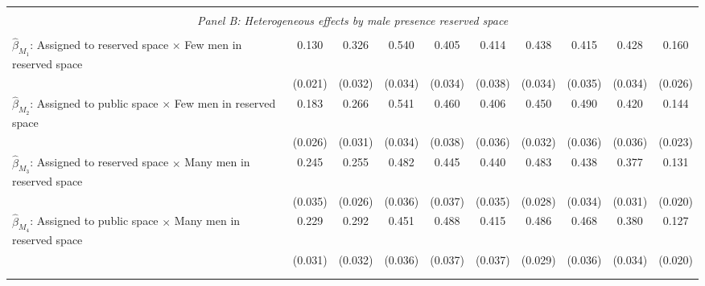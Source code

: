 \begin{tabular}{l*{9}{c}}
\hline \\[-1ex] \multicolumn{10}{c}{\textit{Panel B: Heterogeneous effects by male presence reserved space}} \\\\[-1ex]
$\hat\beta_{M_1}$: Assigned to reserved space $\times$ Few men in reserved space&       0.130\sym{***}&       0.326\sym{***}&       0.540\sym{***}&       0.405\sym{***}&       0.414\sym{***}&       0.438\sym{***}&       0.415\sym{***}&       0.428\sym{***}&       0.160\sym{***}\\
                    &     (0.021)         &     (0.032)         &     (0.034)         &     (0.034)         &     (0.038)         &     (0.034)         &     (0.035)         &     (0.034)         &     (0.026)         \\
[1em]
$\hat\beta_{M_2}$: Assigned to public space $\times$ Few men in reserved space&       0.183\sym{***}&       0.266\sym{***}&       0.541\sym{***}&       0.460\sym{***}&       0.406\sym{***}&       0.450\sym{***}&       0.490\sym{***}&       0.420\sym{***}&       0.144\sym{***}\\
                    &     (0.026)         &     (0.031)         &     (0.034)         &     (0.038)         &     (0.036)         &     (0.032)         &     (0.036)         &     (0.036)         &     (0.023)         \\
[1em]
$\hat\beta_{M_3}$: Assigned to reserved space $\times$ Many men in reserved space&       0.245\sym{***}&       0.255\sym{***}&       0.482\sym{***}&       0.445\sym{***}&       0.440\sym{***}&       0.483\sym{***}&       0.438\sym{***}&       0.377\sym{***}&       0.131\sym{***}\\
                    &     (0.035)         &     (0.026)         &     (0.036)         &     (0.037)         &     (0.035)         &     (0.028)         &     (0.034)         &     (0.031)         &     (0.020)         \\
[1em]
$\hat\beta_{M_4}$: Assigned to public space $\times$ Many men in reserved space&       0.229\sym{***}&       0.292\sym{***}&       0.451\sym{***}&       0.488\sym{***}&       0.415\sym{***}&       0.486\sym{***}&       0.468\sym{***}&       0.380\sym{***}&       0.127\sym{***}\\
                    &     (0.031)         &     (0.032)         &     (0.036)         &     (0.037)         &     (0.037)         &     (0.029)         &     (0.036)         &     (0.034)         &     (0.020)         \\
\\[-1.8ex] \hline \\[-1.8ex]  

\end{tabular}
